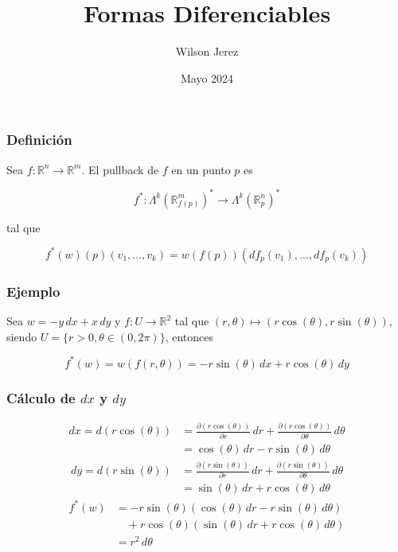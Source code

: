 \documentclass{beamer}
\title{Formas Diferenciables}
\author{Wilson Jerez}
\date{Mayo 2024}
\begin{document}
\frame{\titlepage}

\begin{frame}
\frametitle{Definición}

Sea \( f: \mathbb{R}^{n} \to \mathbb{R}^{m} \). El pullback de \( f \) en un punto \( p \) es 

\[ f^{*}:\varLambda^{k}(\mathbb{R}^{m}_{f(p)})^{*} \to \varLambda^{k}(\mathbb{R}^{n}_{p})^{*} \]

tal que 

\[ f^{*}(w)(p)(v_{1},\dots,v_{k}) = w(f(p))(df_{p}(v_{1}),\dots,df_{p}(v_{k})) \]

\end{frame}

\begin{frame}
\frametitle{Ejemplo}

Sea \( w = -y \, dx + x \, dy \) y \( f:U \to \mathbb{R}^{2} \) tal que \( (r,\theta) \mapsto (r\cos(\theta),r\sin(\theta)) \), siendo \( U = \{ r > 0, \theta \in (0,2\pi) \} \), entonces 

\[ f^{*}(w) = w(f(r,\theta)) = -r\sin(\theta) \, dx + r\cos(\theta) \, dy \]

\end{frame}

\begin{frame}
\frametitle{Cálculo de \( dx \) y \( dy \)}

\begin{align*}
    dx = d(r\cos(\theta)) &= \frac{\partial (r\cos(\theta))}{\partial r} \, dr + \frac{\partial (r\cos(\theta))}{\partial \theta} \, d\theta \\
        &= \cos(\theta) \, dr - r\sin(\theta) \, d\theta
\end{align*}
\begin{align*}
    dy = d(r\sin(\theta)) &= \frac{\partial (r\sin(\theta))}{\partial r} \, dr + \frac{\partial (r\sin(\theta))}{\partial \theta} \, d\theta \\
        &= \sin(\theta) \, dr + r\cos(\theta) \, d\theta
\end{align*}
\begin{align*}
    f^{*}(w) &= -r\sin(\theta)(\cos(\theta) \, dr - r\sin(\theta) \, d\theta) \\
    &\quad + r\cos(\theta)(\sin(\theta) \, dr + r\cos(\theta) \, d\theta) \\
    &= r^{2} \, d\theta
\end{align*}

\end{frame}
\end{document}
